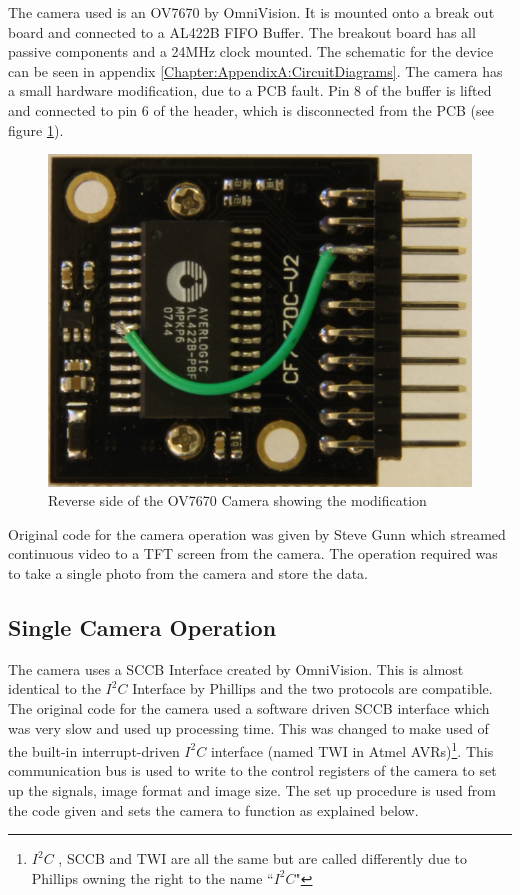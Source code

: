 The camera used is an OV7670 by OmniVision. It is mounted onto a break out board and connected to a AL422B FIFO Buffer. The breakout board has all passive components and a 24MHz clock mounted. The schematic for the device can be seen in appendix \ref{Chapter:AppendixA:CircuitDiagrams}. The camera has a small hardware modification, due to a PCB fault. Pin 8 of the buffer is lifted and connected to pin 6 of the header, which is disconnected from the PCB (see figure \ref{fig:OV7670:Mod}).
\begin{figure}
\centering
\includegraphics[width=\textwidth /4]{Figures/OV7670_Back.jpg}
\caption{Reverse side of the OV7670 Camera showing the modification}
\label{fig:OV7670:Mod}
\end{figure}
Original code for the camera operation was given by Steve Gunn which streamed continuous video to a TFT screen from the camera. The operation required was to take a single photo from the camera and store the data. 

\subsection{Single Camera Operation}

The camera uses a SCCB Interface \citep{SCCB_Interface} created by OmniVision. This is almost identical to the $I^{2}C$ Interface by Phillips and the two protocols are compatible. The original code for the camera used a software driven SCCB interface which was very slow and used up processing time. This was changed to make used of the built-in interrupt-driven $I^{2}C$ interface (named TWI in Atmel AVRs)\footnote{$I^{2}C$ , SCCB and TWI are all the same but are called differently due to Phillips owning the right to the name ``$I^{2}C$"}. This communication bus is used to write to the control registers of the camera to set up the signals, image format and image size. The set up procedure is used from the code given and sets the camera to function as explained below.

